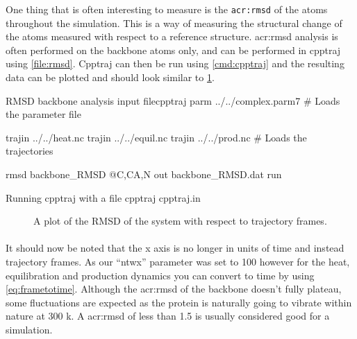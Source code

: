         One thing that is often interesting to measure is the \texttt{\gls{acr:rmsd}} of the atoms throughout the simulation. This is a way of measuring the structural change of the atoms measured with respect to a reference structure. \gls{acr:rmsd} analysis is often performed on the backbone atoms only, and can be performed in cpptraj using \cref{file:rmsd}. Cpptraj can then be run using \cref{cmd:cpptraj} and the resulting data can be plotted and should look similar to \cref{fig:RMSD}.

    \begin{inpfile}[label=file:rmsd]{RMSD backbone analysis input file}{cpptraj}
    parm ../../complex.parm7
    # Loads the parameter file
    
    trajin ../../heat.nc
    trajin ../../equil.nc
    trajin ../../prod.nc
    # Loads the trajectories


    rmsd backbone_RMSD @C,CA,N out backbone_RMSD.dat 
    run
    \end{inpfile}

    \begin{bashcmd}[label=cmd:cpptraj]{Running cpptraj with a file}
        cpptraj cpptraj.in
    \end{bashcmd}

    \begin{figure}[H]
        \centering
        \caption{A plot of the RMSD of the system with respect to trajectory frames.}
        \label{fig:RMSD}
    \end{figure}

    \paragraph{}
        It should now be noted that the x axis is no longer in units of time and instead trajectory frames. As our \enquote{ntwx} parameter was set to 100 however for the heat, equilibration and production dynamics you can convert to time by using \cref{eq:frametotime}. Although the \gls{acr:rmsd} of the backbone doesn't fully plateau, some fluctuations are expected as the protein is naturally going to vibrate within nature at 300 k. A \gls{acr:rmsd} of less than 1.5 is usually considered good for a simulation.

